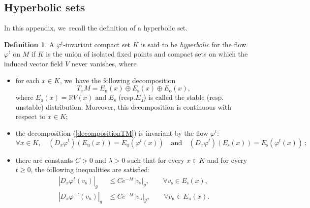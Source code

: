 \documentclass[11pt]{article}
\newcommand{\resp}{resp.\xspace}
\newcommand{\ro}{\mathrm{o}}
\newcommand{\rs}{\mathrm{s}}
\newcommand{\ru}{\mathrm{u}}
\theoremstyle{definition}
\newtheorem{definition}{Definition}[section]
\theoremstyle{plain}
\newcommand{\R}{\mathbb{R}}
\begin{document}
\begin{appendix}

\section{Hyperbolic sets}\label{Appendix: hyperbolic set}

In this appendix, we~recall the definition of a hyperbolic set.

\begin{definition}A $\varphi^t$-invariant compact set $K$ is said to be \emph{hyperbolic} for the flow~$\varphi^t$ on $M$ if $K$ is the union of isolated fixed points and compact sets on which the induced vector field $V$ never vanishes, where
\begin{itemize}
\item for each $x \in K$, we~have the following decomposition
\begin{equation}\label{decompositionTM}
T_x M = E_\ru (x) \oplus E_\rs(x) \oplus E_\ro (x),
\end{equation}
where $E_\ro (x) = \R V(x)$ and $E_\rs$ (\resp $E_\ru$) is called the stable (\resp unstable) distribution. Moreover, this decomposition is continuous with respect to $x \in K$;
\item the decomposition (\ref{decompositionTM}) is invariant by the flow $\varphi^t$:
\[
\forall x \in K, \quad (D_x \varphi^t)(E_\ru(x)) = E_\ru(\varphi^t (x)) \quad \text{and} \quad (D_x \varphi^t)(E_\rs(x)) = E_\rs(\varphi^t (x))\,;
\]
\item there are constants $C > 0$ and $\lambda > 0$ such that for every $x \in K$ and for every $t \geq 0$, the following inequalities are satisfied:
\begin{equation}\label{eq: hyperbolic inegality on an hyperbolic set}
\begin{split}
| D_x \varphi^t (v_\rs) |_g &\leq C e^{-\lambda t} |v_\rs|_g, \quad \quad \forall v_\rs \in E_\rs(x), \\
| D_x \varphi^{-t} (v_\ru) |_g &\leq C e^{-\lambda t} |v_\ru|_g, \quad \quad \forall v_\ru \in E_\ru(x).
\end{split}
\end{equation}
\end{itemize}
\end{definition}


\end{appendix}
\end{document}
